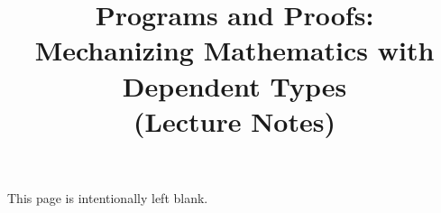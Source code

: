 \documentclass[12pt]{report}
\title{Programs and Proofs:\\
Mechanizing Mathematics with Dependent Types 
\\
(Lecture Notes)
}
\author{}
\begin{document}
\maketitle

\thispagestyle{empty}
\mbox{}\vfill

\begin{center}

This page is intentionally left blank.

\end{center}

\tableofcontents








\clearpage
{}



\end{document}
